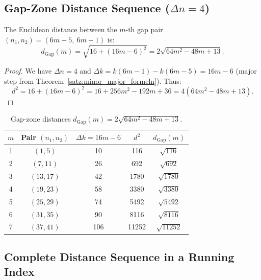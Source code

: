 \subsection{Gap-Zone Distance Sequence (\texorpdfstring{$\Delta n = 4$}{Δn=4})}

\begin{theorem}
\label{satz:gap_distanz}
The Euclidean distance between the $m$-th gap pair
$(n_1, n_2) = (6m-5,\ 6m-1)$ is:
\begin{equation}
  \boxed{
  d_{\mathrm{Gap}}(m)
  = \sqrt{16 + (16m-6)^2}
  = 2\sqrt{64m^2 - 48m + 13}.
  }
\end{equation}
\end{theorem}

\begin{proof}
We have $\Delta n = 4$ and $\Delta k = k(6m-1)-k(6m-5) = 16m-6$
(major step from Theorem~\ref{satz:minor_major_formeln}). Thus:
\[
  d^2 = 16 + (16m-6)^2
      = 16 + 256m^2-192m+36
      = 4(64m^2-48m+13).
\]
\end{proof}

\begin{table}[H]
\centering
\caption{Gap-zone distances $d_{\mathrm{Gap}}(m) = 2\sqrt{64m^2-48m+13}$.}
\renewcommand{\arraystretch}{1.15}
\begin{tabular}{ccccc}
\toprule
$m$ & Pair $(n_1, n_2)$ & $\Delta k = 16m-6$ & $d^2$ & $d_{\mathrm{Gap}}(m)$ \\
\midrule
1 & $( 1,  5)$ & 10 &   116 & $\sqrt{116}$  \\
2 & $( 7, 11)$ & 26 &   692 & $\sqrt{692}$  \\
3 & $(13, 17)$ & 42 &  1780 & $\sqrt{1780}$ \\
4 & $(19, 23)$ & 58 &  3380 & $\sqrt{3380}$ \\
5 & $(25, 29)$ & 74 &  5492 & $\sqrt{5492}$ \\
6 & $(31, 35)$ & 90 &  8116 & $\sqrt{8116}$ \\
7 & $(37, 41)$ & 106 & 11252 & $\sqrt{11252}$ \\
\bottomrule
\end{tabular}
\end{table}

\subsection{Complete Distance Sequence in a Running Index}


